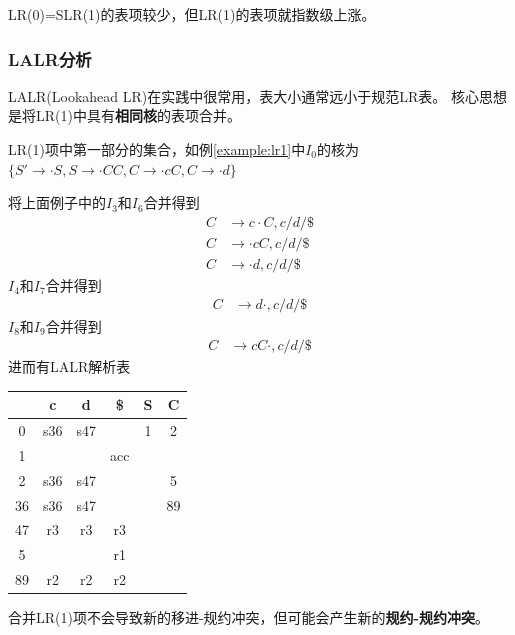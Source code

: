 LR(0)=SLR(1)的表项较少，但LR(1)的表项就指数级上涨。

\subsubsection{LALR分析}
LALR(Lookahead LR)在实践中很常用，表大小通常远小于规范LR表。
核心思想是将LR(1)中具有\textbf{相同核}的表项合并。

\begin{definition}[核(core)]
LR(1)项中第一部分的集合，如例\ref{example:lr1}中$I_0$的核为$\{S'\to\cdot S, S\to\cdot CC, C\to\cdot cC, C\to \cdot d\}$
\end{definition}

\begin{example}
将上面例子中的$I_3$和$I_6$合并得到
\[\begin{aligned}
C &\to c\cdot C, c/d/\$\\
C &\to \cdot cC, c/d/\$\\
C &\to \cdot d, c/d/\$
\end{aligned}\]
$I_4$和$I_7$合并得到
\[\begin{aligned}
C &\to d\cdot, c/d/\$
\end{aligned}\]
$I_8$和$I_9$合并得到
\[\begin{aligned}
C &\to cC\cdot, c/d/\$
\end{aligned}\]
进而有LALR解析表
\begin{center}
\begin{tabular}{|c|c|c|c|c|c|}\hline
   & c   & d   & \$  & S & C \\\hline
0  & s36 & s47 &     & 1 & 2 \\\hline
1  &     &     & acc &   &   \\\hline
2  & s36 & s47 &     &   & 5 \\\hline
36 & s36 & s47 &     &   & 89\\\hline
47 & r3  & r3  & r3  &   &   \\\hline
5  &     &     & r1  &   &   \\\hline
89 & r2  & r2  & r2  &   &   \\\hline
\end{tabular}
\end{center}
\end{example}

合并LR(1)项不会导致新的移进-规约冲突，但可能会产生新的\textbf{规约-规约冲突}。

